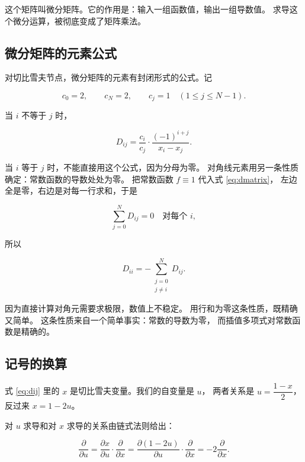 这个矩阵叫微分矩阵。它的作用是：输入一组函数值，输出一组导数值。
求导这个微分运算，被彻底变成了矩阵乘法。

\subsection{微分矩阵的元素公式}

对切比雪夫节点，微分矩阵的元素有封闭形式的公式。记

\begin{equation}
c_0 = 2,\qquad c_N = 2,\qquad c_j = 1 \quad (1\le j\le N-1).
\end{equation}

当 $i$ 不等于 $j$ 时，

\begin{equation}
D_{ij} = \frac{c_i}{c_j}\cdot\frac{(-1)^{i+j}}{x_i-x_j}.
\label{eq:dij}
\end{equation}

当 $i$ 等于 $j$ 时，不能直接用这个公式，因为分母为零。
对角线元素用另一条性质确定：常数函数的导数处处为零。
把常数函数 $f\equiv1$ 代入式 \eqref{eq:dmatrix}，
左边全是零，右边是对每一行求和，于是

\begin{equation}
\sum_{j=0}^{N}D_{ij} = 0 \quad\text{对每个 }i,
\end{equation}

所以

\begin{equation}
D_{ii} = -\sum_{\substack{j=0\\j\ne i}}^{N}D_{ij}.
\label{eq:dii}
\end{equation}

因为直接计算对角元需要求极限，数值上不稳定。
用行和为零这条性质，既精确又简单。
这条性质来自一个简单事实：常数的导数为零，
而插值多项式对常数函数是精确的。

\subsection{记号的换算}

式 \eqref{eq:dij} 里的 $x$ 是切比雪夫变量。我们的自变量是 $u$，
两者关系是 $u=\dfrac{1-x}{2}$，反过来 $x=1-2u$。

对 $u$ 求导和对 $x$ 求导的关系由链式法则给出：

\begin{equation}
\frac{\partial}{\partial u}
= \frac{\partial x}{\partial u}\cdot\frac{\partial}{\partial x}
= \frac{\partial(1-2u)}{\partial u}\cdot\frac{\partial}{\partial x}
= -2\frac{\partial}{\partial x}.
\end{equation}

